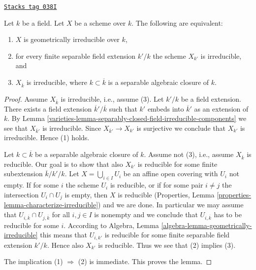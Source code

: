 \begin{lemma}
\label{varieties-lemma-characterize-geometrically-irreducible}
\href{https://stacks.math.columbia.edu/tag/038I}{\texttt{Stacks tag 038I}}


Let $k$ be a field. Let $X$ be a scheme over $k$.
The following are equivalent:
\begin{enumerate}
\item $X$ is geometrically irreducible over $k$,
\item for every finite separable field extension $k'/k$
the scheme $X_{k'}$ is irreducible, and
\item $X_{\overline{k}}$ is irreducible, where $k \subset \overline{k}$
is a separable algebraic closure of $k$.
\end{enumerate}
\end{lemma}

\begin{proof}

Assume $X_{\overline{k}}$ is irreducible, i.e., assume (3).
Let $k'/k$ be a field extension.
There exists a field extension $\overline{k}'/\overline{k}$
such that $k'$ embeds into $\overline{k}'$ as an extension of $k$.
By Lemma \ref{varieties-lemma-separably-closed-field-irreducible-components}
we see that $X_{\overline{k}'}$ is irreducible.
Since $X_{\overline{k}'} \to X_{k'}$ is surjective we conclude
that $X_{k'}$ is irreducible. Hence (1) holds.

\medskip\noindent
Let $k \subset \overline{k}$ be a separable algebraic closure of $k$.
Assume not (3), i.e., assume $X_{\overline{k}}$ is reducible.
Our goal is to show that also $X_{k'}$ is
reducible for some finite subextension
$\overline{k}/k'/k$.
Let $X = \bigcup_{i \in I} U_i$ be an affine open covering
with $U_i$ not empty. If for some $i$ the scheme
$U_i$ is reducible, or if for some pair $i \not = j$ the
intersection $U_i \cap U_j$ is empty, then $X$ is reducible
(Properties, Lemma \ref{properties-lemma-characterize-irreducible})
and we are done.
In particular we may assume that
$U_{i, \overline{k}} \cap U_{j, \overline{k}}$ for all $i, j \in I$
is nonempty and we conclude that $U_{i, \overline{k}}$ has
to be reducible for some $i$. According to
Algebra, Lemma \ref{algebra-lemma-geometrically-irreducible}
this means that $U_{i, k'}$ is reducible for some
finite separable field extension $k'/k$.
Hence also $X_{k'}$ is reducible. Thus we see that
(2) implies (3).

\medskip\noindent
The implication (1) $\Rightarrow$ (2) is immediate.
This proves the lemma.
\end{proof}

